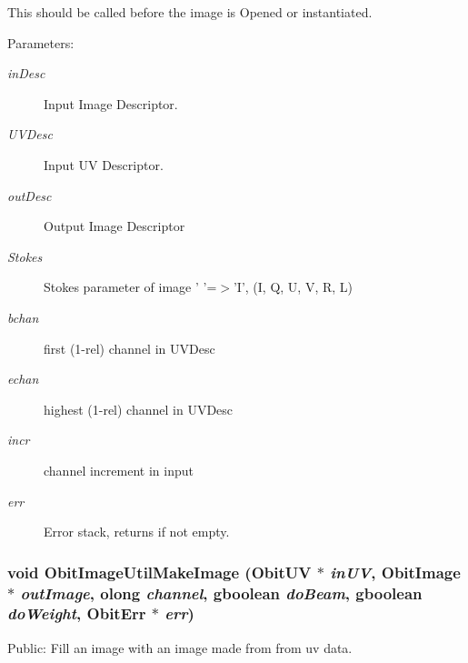 This should be called before the image is Opened or instantiated. \begin{Desc}
\item[Parameters:]
\begin{description}
\item[{\em in\-Desc}]Input Image Descriptor. \item[{\em UVDesc}]Input UV Descriptor. \item[{\em out\-Desc}]Output Image Descriptor \item[{\em Stokes}]Stokes parameter of image ' '=$>$'I', (I, Q, U, V, R, L) \item[{\em bchan}]first (1-rel) channel in UVDesc \item[{\em echan}]highest (1-rel) channel in UVDesc \item[{\em incr}]channel increment in input \item[{\em err}]Error stack, returns if not empty. \end{description}
\end{Desc}
\subsubsection{\setlength{\rightskip}{0pt plus 5cm}void Obit\-Image\-Util\-Make\-Image ({\bf Obit\-UV} $\ast$ {\em in\-UV}, {\bf Obit\-Image} $\ast$ {\em out\-Image}, {\bf olong} {\em channel}, gboolean {\em do\-Beam}, gboolean {\em do\-Weight}, {\bf Obit\-Err} $\ast$ {\em err})}\label{ObitImageUtil_8h_a2}


Public: Fill an image with an image made from from uv data. 

